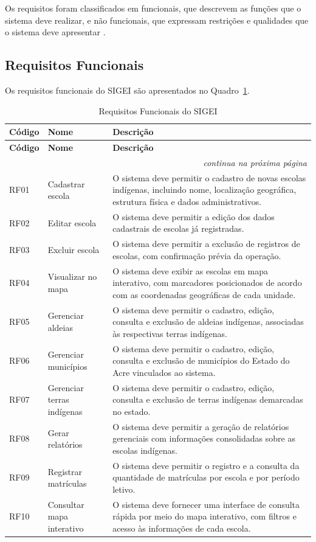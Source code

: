 \documentclass[12pt,a4paper,oneside]{abntspiifac}
\begin{document}
Os requisitos foram classificados em funcionais, que descrevem as funções que o sistema deve realizar, e não funcionais, que expressam restrições e qualidades que o sistema deve apresentar \cite{pressman2016}.

\subsection{Requisitos Funcionais}

Os requisitos funcionais do SIGEI são apresentados no Quadro~\ref{qua:rf}.

\begin{longtable}{p{1.5cm}p{4.5cm}p{7.5cm}}
\caption{Requisitos Funcionais do SIGEI}
\label{qua:rf} \\
\toprule
\textbf{Código} & \textbf{Nome} & \textbf{Descrição} \\
\midrule
\endfirsthead
\toprule
\textbf{Código} & \textbf{Nome} & \textbf{Descrição} \\
\midrule
\endhead
\midrule
\multicolumn{3}{r}{\small\textit{continua na próxima página}} \\
\endfoot
\bottomrule
\endlastfoot
RF01 & Cadastrar escola        & O sistema deve permitir o cadastro de novas escolas indígenas, incluindo nome, localização geográfica, estrutura física e dados administrativos. \\[4pt]
RF02 & Editar escola           & O sistema deve permitir a edição dos dados cadastrais de escolas já registradas. \\[4pt]
RF03 & Excluir escola          & O sistema deve permitir a exclusão de registros de escolas, com confirmação prévia da operação. \\[4pt]
RF04 & Visualizar no mapa      & O sistema deve exibir as escolas em mapa interativo, com marcadores posicionados de acordo com as coordenadas geográficas de cada unidade. \\[4pt]
RF05 & Gerenciar aldeias       & O sistema deve permitir o cadastro, edição, consulta e exclusão de aldeias indígenas, associadas às respectivas terras indígenas. \\[4pt]
RF06 & Gerenciar municípios    & O sistema deve permitir o cadastro, edição, consulta e exclusão de municípios do Estado do Acre vinculados ao sistema. \\[4pt]
RF07 & Gerenciar terras indígenas & O sistema deve permitir o cadastro, edição, consulta e exclusão de terras indígenas demarcadas no estado. \\[4pt]
RF08 & Gerar relatórios        & O sistema deve permitir a geração de relatórios gerenciais com informações consolidadas sobre as escolas indígenas. \\[4pt]
RF09 & Registrar matrículas    & O sistema deve permitir o registro e a consulta da quantidade de matrículas por escola e por período letivo. \\[4pt]
RF10 & Consultar mapa interativo & O sistema deve fornecer uma interface de consulta rápida por meio do mapa interativo, com filtros e acesso às informações de cada escola. \\
\end{longtable}
\end{document}
